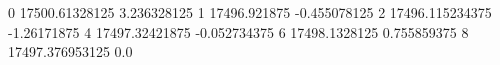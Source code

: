 0 17500.61328125 3.236328125
1 17496.921875 -0.455078125
2 17496.115234375 -1.26171875
4 17497.32421875 -0.052734375
6 17498.1328125 0.755859375
8 17497.376953125 0.0

